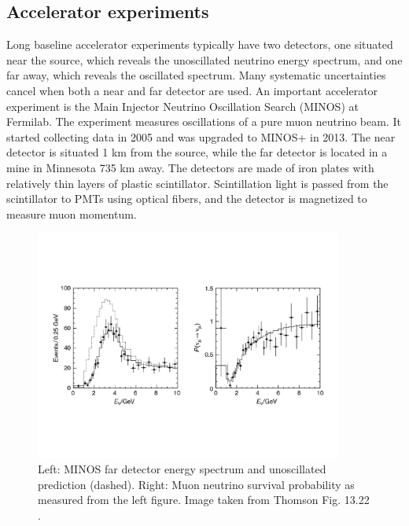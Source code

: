 \subsection{Accelerator experiments}
Long baseline accelerator experiments typically have two detectors, one
situated near the source, which reveals the unoscillated neutrino energy
spectrum, and one far away, which reveals the oscillated spectrum.
Many systematic uncertainties cancel when both a near and far detector are
used.
An important accelerator experiment is the Main Injector Neutrino Oscillation
Search (MINOS) at Fermilab. The experiment measures oscillations
of a pure muon neutrino beam. It started collecting data in 2005 and
was upgraded to MINOS+ in 2013. The near detector is situated 1 km
from the source, while the far detector is located in a mine in Minnesota
735 km away. The detectors are made of iron plates with relatively
thin layers of
plastic scintillator. Scintillation light is passed from the scintillator to
PMTs using optical fibers, and the detector is magnetized to measure
muon momentum.

\begin{figure}
  \centering
  \includegraphics[width=0.90\textwidth,height=0.90\textheight,keepaspectratio]
                {pictures/t13_22.pdf}
  \vspace*{-20mm}
  \caption{Left: MINOS far detector energy spectrum and unoscillated
           prediction (dashed). Right: Muon neutrino survival probability
           as measured from the left figure. Image taken from Thomson
           Fig. 13.22 \cite{thomson_modern_2013}.}
  \label{fig:minos}
\end{figure}


